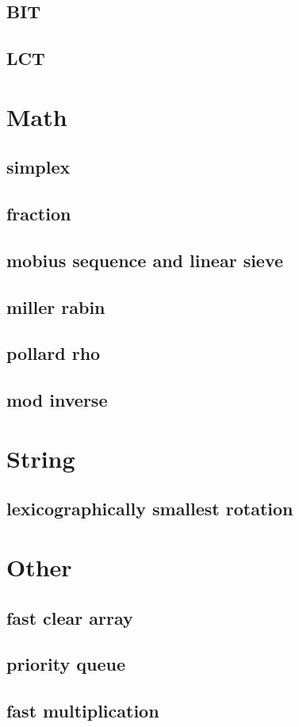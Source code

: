 \documentclass[a4paper,10pt,twocolumn,oneside]{article}
\begin{document}
\subsection{BIT}

\subsection{LCT}


\section{Math}
\subsection{simplex}

\subsection{fraction}

\subsection{mobius sequence and linear sieve}

\subsection{miller rabin}

\subsection{pollard rho}

\subsection{mod inverse}


\section{String}
\subsection{lexicographically smallest rotation}


\section{Other}
\subsection{fast clear array}

\subsection{priority queue}

\subsection{fast multiplication}

\end{document}

